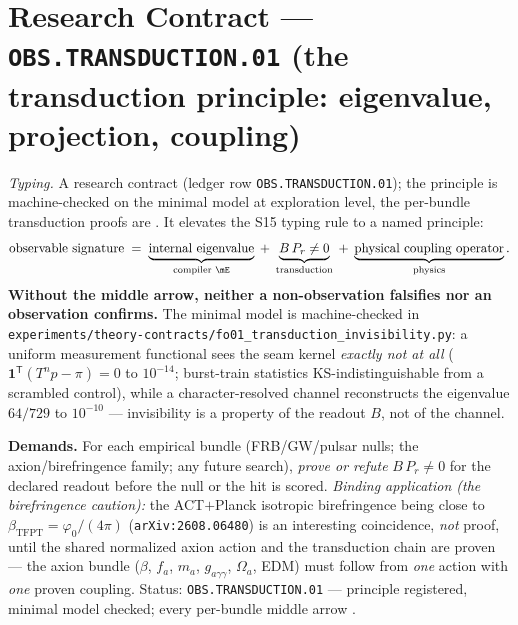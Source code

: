 \documentclass[11pt,a4paper]{article}
\begin{document}
\section*{Research Contract --- \texttt{OBS.TRANSDUCTION.01} (the transduction principle: eigenvalue, projection, coupling)}
\noindent\emph{Typing.} A research contract (ledger row \texttt{OBS.TRANSDUCTION.01}); the
principle is machine-checked on the minimal model at exploration level, the per-bundle
transduction proofs are \mO.  It elevates the S15 typing rule to a named principle:
\[
  \text{observable signature}
  \;=\;
  \underbrace{\text{internal eigenvalue}}_{\text{compiler \mE}}
  \;+\;
  \underbrace{B\,P_r\neq0}_{\text{transduction}}
  \;+\;
  \underbrace{\text{physical coupling operator}}_{\text{physics}} .
\]
\textbf{Without the middle arrow, neither a non-observation falsifies nor an observation
confirms.}  The minimal model is machine-checked in
\texttt{experiments/\allowbreak theory-contracts/\allowbreak fo01\_transduction\_invisibility.py}: a uniform measurement
functional sees the seam kernel \emph{exactly not at all} ($\mathbf1^{\mathsf T}(T^np-\pi)=0$ to
$10^{-14}$; burst-train statistics KS-indistinguishable from a scrambled control), while a
character-resolved channel reconstructs the eigenvalue $64/729$ to $10^{-10}$ --- invisibility
is a property of the readout $B$, not of the channel.

\par\smallskip\noindent\textbf{Demands.}  For each empirical bundle (FRB/GW/pulsar nulls; the
axion/birefringence family; any future search), \emph{prove or refute} $B\,P_r\neq0$ for the
declared readout before the null or the hit is scored.  \emph{Binding application (the
birefringence caution):} the ACT$+$Planck isotropic birefringence being close to
$\beta_{\mathrm{TFPT}}=\varphi_0/(4\pi)$ (\texttt{arXiv:2608.06480}) is an interesting
coincidence, \emph{not} proof, until the shared normalized axion action and the transduction
chain are proven --- the axion bundle ($\beta$, $f_a$, $m_a$, $g_{a\gamma\gamma}$, $\Omega_a$,
EDM) must follow from \emph{one} action with \emph{one} proven coupling.  Status:
\texttt{OBS.TRANSDUCTION.01} --- principle registered, minimal model checked; every per-bundle
middle arrow \mO.

\end{document}
